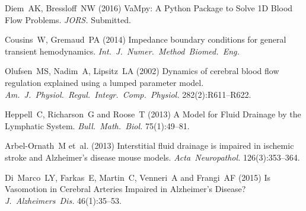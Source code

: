 \documentclass[a4paper,titlepage]{scrartcl}
\begin{document}
\begin{thebibliography}{10}
Diem~AK, Bressloff~NW (2016) VaMpy: A Python Package to Solve 1D Blood Flow Problems. {\em JORS.} Submitted.

Cousins~W, Gremaud~PA (2014) Impedance boundary conditions for general transient hemodynamics. {\em Int.~J.~Numer.~Method~Biomed.~Eng.}
  
Olufsen~MS, Nadim~A, Lipsitz~LA (2002) Dynamics of cerebral blood flow regulation explained using a lumped parameter model. {\em Am.~J.~Physiol.~Regul.~Integr.~Comp.~Physiol.} 282(2):R611--R622.



Heppell~C, Richarson~G and Roose~T (2013) A Model for Fluid Drainage by the Lymphatic System. {\em Bull.~Math.~Biol.} 75(1):49--81.

Arbel-Ornath~M et~al. (2013) Interstitial fluid drainage is impaired in ischemic stroke and Alzheimer's disease mouse models. {\em Acta~Neuropathol.} 126(3):353--364.

Di~Marco~LY, Farkas~E, Martin~C, Venneri~A and Frangi~AF (2015) Is Vasomotion in Cerebral Arteries Impaired in Alzheimer's Disease? {\em J.~Alzheimers~Dis.} 46(1):35--53.
\end{thebibliography}
\end{document}
